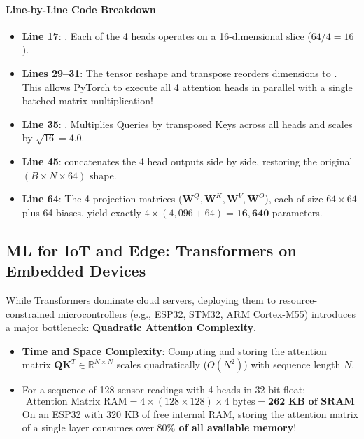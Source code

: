 \paragraph{Line-by-Line Code Breakdown}
\begin{itemize}
    \item \textbf{Line 17}: . Each of the 4 heads operates on a 16-dimensional slice ($64 / 4 = 16$).
    \item \textbf{Lines 29--31}: The tensor reshape and transpose  reorders dimensions to . This allows PyTorch to execute all 4 attention heads in parallel with a single batched matrix multiplication!
    \item \textbf{Line 35}: . Multiplies Queries by transposed Keys across all heads and scales by $\sqrt{16} = 4.0$.
    \item \textbf{Line 45}:  concatenates the 4 head outputs side by side, restoring the original $(B \times N \times 64)$ shape.
    \item \textbf{Line 64}: The 4 projection matrices ($\mathbf{W}^Q, \mathbf{W}^K, \mathbf{W}^V, \mathbf{W}^O$), each of size $64 \times 64$ plus 64 biases, yield exactly $4 \times (4{,}096 + 64) = \mathbf{16{,}640}$ parameters.
\end{itemize}

\subsection{ML for IoT and Edge: Transformers on Embedded Devices}\label{subsec:iot_transformers}

\begin{iotbox}
While Transformers dominate cloud servers, deploying them to resource-constrained microcontrollers (e.g., ESP32, STM32, ARM Cortex-M55) introduces a major bottleneck: \textbf{Quadratic Attention Complexity}.
\begin{itemize}
    \item \textbf{Time and Space Complexity}: Computing and storing the attention matrix $\mathbf{Q}\mathbf{K}^T \in \mathbb{R}^{N \times N}$ scales quadratically ($O(N^2)$) with sequence length $N$.
    \item For a sequence of 128 sensor readings with 4 heads in 32-bit float:
    \begin{equation*}
    \text{Attention Matrix RAM} = 4 \times (128 \times 128) \times 4 \text{ bytes} = \mathbf{262\text{ KB of SRAM}}
    \end{equation*}
    On an ESP32 with 320 KB of free internal RAM, storing the attention matrix of a single layer consumes over \textbf{$80\%$ of all available memory}!
\end{itemize}
\end{iotbox}

